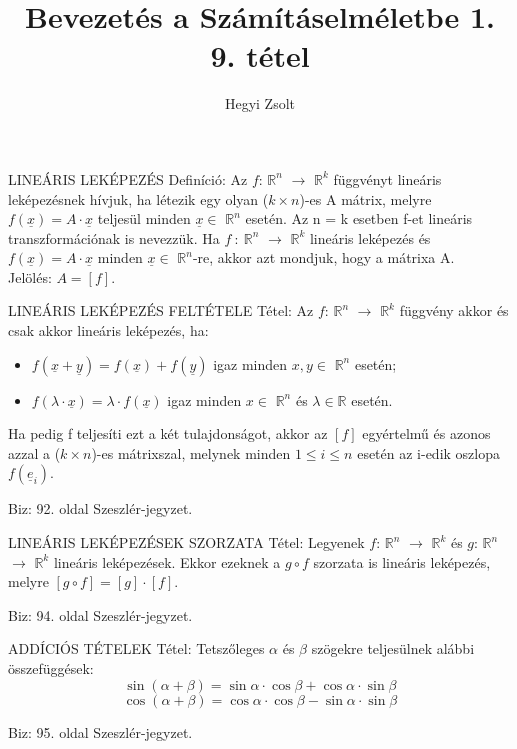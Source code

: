 \documentclass[]{article}
\title{Bevezetés a Számításelméletbe 1.\\{\large 9. tétel}}
\author{Hegyi Zsolt}
\newcommand{\R}{\mathbb{R}}
\newcommand{\Rn}[1]{$\mathbb{R}^{#1}$}
\newcommand{\Und}[1]{\underline{#1}}
\begin{document}
\maketitle{}
\begin{shaded}
LINEÁRIS LEKÉPEZÉS Definíció: Az $f$: \Rn{n} $\rightarrow$ \Rn{k} függvényt lineáris leképezésnek hívjuk, ha létezik egy olyan ($k \times n$)-es A  mátrix, melyre $f(\Und{x}) = A \cdot \Und{x}$ teljesül minden $\Und{x} \in$ \Rn{n} esetén. Az n = k esetben f-et lineáris transzformációnak is nevezzük. Ha $f\::\:$\Rn{n} $\rightarrow$ \Rn{k} lineáris leképezés és $f(\Und{x}) = A \cdot \Und{x}$ minden $\Und{x} \in$ \Rn{n}-re, akkor azt mondjuk, hogy a mátrixa A.\\
Jelölés: $A = [f]$.
\end{shaded}
\begin{framed}
LINEÁRIS LEKÉPEZÉS FELTÉTELE Tétel: Az $f$: \Rn{n} $\rightarrow$ \Rn{k} függvény akkor és csak akkor lineáris leképezés, ha:
\begin{itemize}
\item $f(\Und{x} + \Und{y}) = f(\Und{x}) + f(\Und{y})$ igaz minden $x,y \in$ \Rn{n} esetén;
\item $f(\lambda \cdot \Und{x}) = \lambda \cdot f(\Und{x})$ igaz minden $x \in$ \Rn{n} és $\lambda \in \R$ esetén.
\end{itemize}
Ha pedig f teljesíti ezt a két tulajdonságot, akkor az $[f]$ egyértelmű és azonos azzal a ($k \times n$)-es mátrixszal, melynek minden $1 \leq i \leq n$ esetén az i-edik oszlopa $f(\Und{e}_i)$.
\end{framed}
\begin{leftbar}
Biz: 92. oldal Szeszlér-jegyzet.
\end{leftbar}
\begin{framed}
LINEÁRIS LEKÉPEZÉSEK SZORZATA Tétel: Legyenek $f$: \Rn{n} $\rightarrow$ \Rn{k} és $g$: \Rn{n} $\rightarrow$ \Rn{k} lineáris leképezések. Ekkor ezeknek a $g \circ f$ szorzata is lineáris leképezés, melyre $[g \circ f] = [g] \cdot [f]$.
\end{framed}
\begin{leftbar}
Biz: 94. oldal Szeszlér-jegyzet.
\end{leftbar}
\begin{framed}
ADDÍCIÓS TÉTELEK Tétel: Tetszőleges $\alpha$ és $\beta$ szögekre teljesülnek alábbi összefüggések:
$$\sin(\alpha + \beta) = \sin\alpha\cdot\cos\beta + \cos\alpha\cdot\sin\beta$$
$$\cos(\alpha + \beta) = \cos\alpha\cdot\cos\beta - \sin\alpha\cdot\sin\beta$$
\end{framed}
\begin{leftbar}
Biz: 95. oldal Szeszlér-jegyzet.
\end{leftbar}
\end{document}
